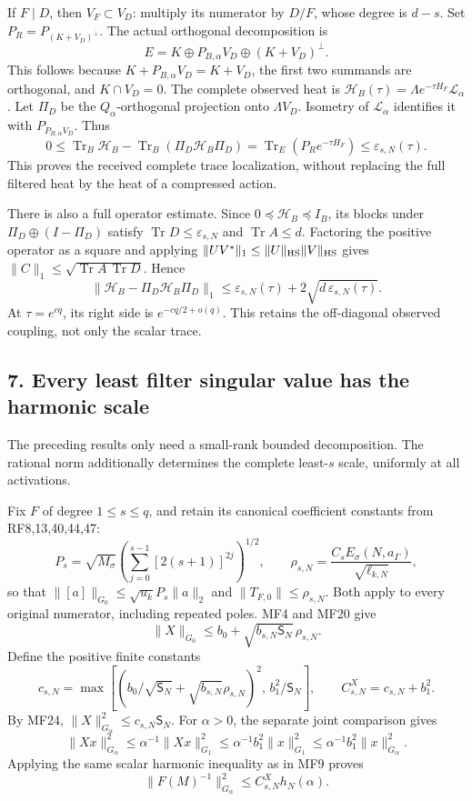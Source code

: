 \documentclass[11pt]{article}
\begin{document}
If \(F\mid D\), then \(V_F\subset V_D\): multiply its numerator by \(D/F\), whose degree is \(d-s\). Set \(P_R=P_{(K+V_D)^\perp}\). The actual orthogonal decomposition is \[
E=K\oplus P_{B,\alpha}V_D\oplus(K+V_D)^\perp.
\] This follows because \(K+P_{B,\alpha}V_D=K+V_D\), the first two summands are orthogonal, and \(K\cap V_D=0\). The complete observed heat is \(\mathcal H_B(\tau)=\Lambda e^{-\tau H_F}\mathcal L_\alpha\). Let \(\Pi_D\) be the \(Q_\alpha\)-orthogonal projection onto \(\Lambda V_D\). Isometry of \(\mathcal L_\alpha\) identifies it with \(P_{P_{B,\alpha}V_D}\). Thus \[
0\le \operatorname{Tr}_B\mathcal H_B
-\operatorname{Tr}_B(\Pi_D\mathcal H_B\Pi_D)
=\operatorname{Tr}_E(P_Re^{-\tau H_F})
\le\varepsilon_{s,N}(\tau).
\tag{MF30}
\] This proves the received complete trace localization, without replacing the full filtered heat by the heat of a compressed action.

There is also a full operator estimate. Since \(0\preceq\mathcal H_B\preceq I_B\), its blocks under \(\Pi_D\oplus(I-\Pi_D)\) satisfy \(\operatorname{Tr}D\le\varepsilon_{s,N}\) and \(\operatorname{Tr}A\le d\). Factoring the positive operator as a square and applying \(\|UV^*\|_1\le\|U\|_{\rm HS}\|V\|_{\rm HS}\) gives \(\|C\|_1\le\sqrt{\operatorname{Tr}A\,\operatorname{Tr}D}\). Hence \[
\boxed{
\|\mathcal H_B-\Pi_D\mathcal H_B\Pi_D\|_1
\le\varepsilon_{s,N}(\tau)+2\sqrt{d\,\varepsilon_{s,N}(\tau)}.}
\tag{MF31}
\] At \(\tau=e^{cq}\), its right side is \(e^{-cq/2+o(q)}\). This retains the off-diagonal observed coupling, not only the scalar trace.

\subsection{7. Every least filter singular value has the harmonic scale}\label{every-least-filter-singular-value-has-the-harmonic-scale}

The preceding results only need a small-rank bounded decomposition. The rational norm additionally determines the complete least-\(s\) scale, uniformly at all activations.

Fix \(F\) of degree \(1\le s\le q\), and retain its canonical coefficient constants from RF8,13,40,44,47: \[
P_s=\sqrt{M_\sigma}
\left(\sum_{j=0}^{s-1}[2(s+1)]^{2j}\right)^{1/2},\qquad
\rho_{s,N}=\frac{C_sE_\sigma(N,a_\Gamma)}{\sqrt{\ell_{k,N}}},
\] so that \(\|[a]\|_{G_0}\le\sqrt{u_k}P_s\|a\|_2\) and \(\|T_{F,0}\|\le\rho_{s,N}\). Both apply to every original numerator, including repeated poles. MF4 and MF20 give \[
\|X\|_{G_0}\le b_0+\sqrt{b_{s,N}\mathsf S_N}\,\rho_{s,N}.
\] Define the positive finite constants \[
c_{s,N}=
\max\left[
\left(b_0/\sqrt{\mathsf S_N}+\sqrt{b_{s,N}}\rho_{s,N}\right)^2,
\,b_1^2/\mathsf S_N
\right],\qquad
C_{s,N}^{X}=c_{s,N}+b_1^2.
\tag{MF32}
\] By MF24, \(\|X\|_{G_\alpha}^2\le c_{s,N}\mathsf S_N\). For \(\alpha>0\), the separate joint comparison gives \[
\|Xx\|_{G_\alpha}^2
\le\alpha^{-1}\|Xx\|_{G_1}^2
\le\alpha^{-1}b_1^2\|x\|_{G_1}^2
\le\alpha^{-1}b_1^2\|x\|_{G_\alpha}^2 .
\] Applying the same scalar harmonic inequality as in MF9 proves \[
\boxed{\|F(M)^{-1}\|_{G_\alpha}^2
\le C_{s,N}^{X}h_N(\alpha).}
\tag{MF33}
\]
\end{document}
